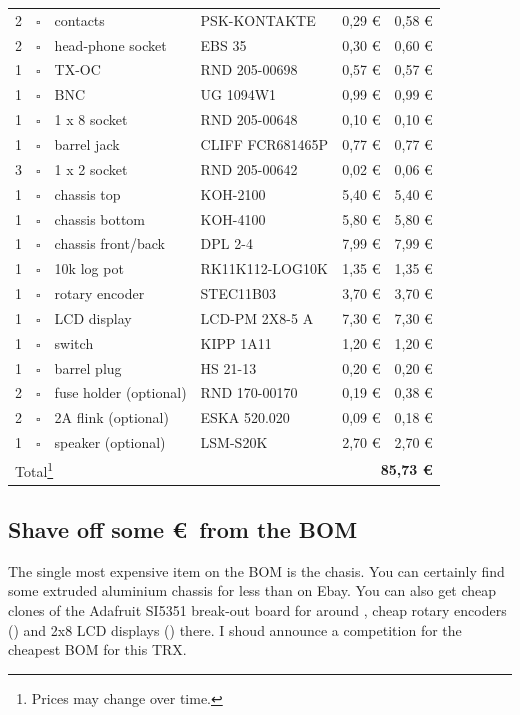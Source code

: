\documentclass[10pt, a4paper,twoside]{scrartcl}
\begin{document}
\begin{longtable}{|p{}|p{}|p{}|p{}|p{}|p{}|}
2 & $\square$ & contacts & PSK-KONTAKTE & 0,29 \euro & 0,58 \euro \\
2 & $\square$ & head-phone socket & EBS 35 & 0,30 \euro & 0,60 \euro\\
1 & $\square$ & TX-OC & RND 205-00698 & 0,57 \euro & 0,57 \euro \\
1 & $\square$ & BNC & UG 1094W1 & 0,99 \euro & 0,99 \euro \\
1 & $\square$ & 1 x 8 socket & RND 205-00648 & 0,10 \euro & 0,10 \euro \\
1 & $\square$ & barrel jack & CLIFF FCR681465P & 0,77 \euro & 0,77 \euro \\
3 & $\square$ & 1 x 2 socket & RND 205-00642 & 0,02 \euro & 0,06 \euro \\ \hline
1 & $\square$ & chassis top & KOH-2100 & 5,40 \euro & 5,40 \euro \\
1 & $\square$ & chassis bottom & KOH-4100 & 5,80 \euro & 5,80 \euro \\
1 & $\square$ & chassis front/back & DPL 2-4 & 7,99 \euro & 7,99 \euro \\
1 & $\square$ & 10k log pot & RK11K112-LOG10K & 1,35 \euro & 1,35 \euro \\
1 & $\square$ & rotary encoder & STEC11B03 & 3,70 \euro & 3,70 \euro \\
1 & $\square$ & LCD display & LCD-PM 2X8-5 A & 7,30 \euro & 7,30 \euro \\
1 & $\square$ & switch & KIPP 1A11 & 1,20 \euro & 1,20 \euro \\
1 & $\square$ & barrel plug & HS 21-13 & 0,20 \euro & 0,20 \euro \\
2 & $\square$ & fuse holder (optional) & RND 170-00170 & 0,19 \euro & 0,38 \euro \\
2 & $\square$ & 2A flink (optional) & ESKA 520.020 & 0,09 \euro & 0,18 \euro \\
1 & $\square$ & speaker (optional) & LSM-S20K & 2,70 \euro & 2,70 \euro \\ \hline \hline
\multicolumn{4}{|l}{Total\footnote{Prices may change over time.}} & \multicolumn{2}{r|}{\textbf{85,73 \euro}} \\ \hline
\end{longtable}

\subsection{Shave off some \euro\ from the BOM}
The single most expensive item on the BOM is the chasis. You can certainly find some extruded aluminium chassis for less than  on Ebay. You can also get cheap clones of the Adafruit SI5351 break-out board for around , cheap rotary encoders () and 2x8 LCD displays () there. I shoud announce a competition for the cheapest BOM for this TRX.
\end{document}
